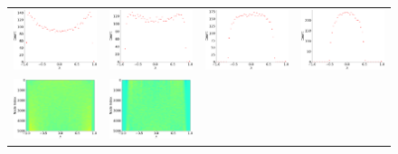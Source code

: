 \documentclass[senior,final,11pt]{iscs-thesis}
\begin{document}
\begin{figure}[htbp]
  \setlength\tabcolsep{0pt}
  \hspace{-3.0cm}
  \begin{tabular}{cccc}
    \includegraphics[width=45mm]{figure/random_regular_graph_d3_n5000txt_dos.png} &
    \includegraphics[width=45mm]{figure/random_regular_graph_d4_n5000txt_dos.png} &
    \includegraphics[width=45mm]{figure/random_regular_graph_d8_n5000txt_dos.png} &
    \includegraphics[width=45mm]{figure/random_regular_graph_d15_n5000txt_dos.png} \\
    \includegraphics[width=45mm]{figure/random_regular_graph_d3_n5000txt_pdos.png} &
    \includegraphics[width=45mm]{figure/random_regular_graph_d4_n5000txt_pdos.png} &

\end{tabular}
\end{figure}
\end{document}
